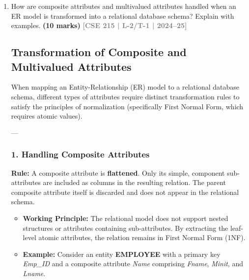\documentclass[12pt,a3paper]{article}
\newcommand{\yr}[1]{\hfill\textcolor{gray}{\small\textbf{[#1]}}}
\newcommand{\mk}[1]{\textcolor{orange!70!black}{\small\textbf{(#1 marks)}}}
\begin{document}
\begin{enumerate}
\begin{tcolorbox}[enhanced,breakable,ansbox,colback=cA!4,colframe=cA,boxrule=0.8pt,arc=5pt,title={\textbf{Answer}},fonttitle=\bfseries\color{white},colbacktitle=cA]
\end{tcolorbox}

\item How are composite attributes and multivalued attributes handled when an ER model is transformed into a relational database schema? Explain with examples.
\mk{10} \yr{CSE 215 | L-2/T-1 | 2024--25}

\begin{tcolorbox}[enhanced,breakable,ansbox,colback=cA!4,colframe=cA,boxrule=0.8pt,arc=5pt,title={\textbf{Answer}},fonttitle=\bfseries\color{white},colbacktitle=cA]

\subsection*{Transformation of Composite and Multivalued Attributes}

When mapping an Entity-Relationship (ER) model to a relational database schema, different types of attributes require distinct transformation rules to satisfy the principles of normalization (specifically First Normal Form, which requires atomic values).

---

\subsubsection*{1. Handling Composite Attributes}

\textbf{Rule:} A composite attribute is \textbf{flattened}. Only its simple, component sub-attributes are included as columns in the resulting relation. The parent composite attribute itself is discarded and does not appear in the relational schema.

\begin{itemize}
    \item \textbf{Working Principle:} The relational model does not support nested structures or attributes containing sub-attributes. By extracting the leaf-level atomic attributes, the relation remains in First Normal Form (1NF).
    \item \textbf{Example:} Consider an entity \textbf{EMPLOYEE} with a primary key \textit{Emp\_ID} and a composite attribute \textit{Name} comprising \textit{Fname}, \textit{Minit}, and \textit{Lname}.
\end{itemize}

\vspace{0.5em}
\begin{center}
\end{center}
\end{tcolorbox}
\end{enumerate}
\end{document}
